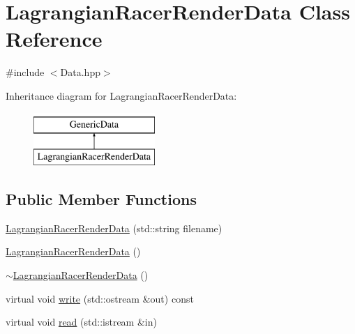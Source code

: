\hypertarget{class_lagrangian_racer_render_data}{\section{Lagrangian\-Racer\-Render\-Data Class Reference}
\label{class_lagrangian_racer_render_data}
}


{\ttfamily \#include $<$Data.\-hpp$>$}

Inheritance diagram for Lagrangian\-Racer\-Render\-Data\-:\begin{figure}[H]
\begin{center}
\leavevmode
\includegraphics[height=2.000000cm]{class_lagrangian_racer_render_data}
\end{center}
\end{figure}
\subsection*{Public Member Functions}
\begin{DoxyCompactItemize}
\item 
\hyperlink{class_lagrangian_racer_render_data_a727934cebfd0e7ef204f2a038be8ff23}{Lagrangian\-Racer\-Render\-Data} (std\-::string filename)
\item 
\hyperlink{class_lagrangian_racer_render_data_aae7fd9c0acf817800ce3875a81ef2ccb}{Lagrangian\-Racer\-Render\-Data} ()
\item 
\hyperlink{class_lagrangian_racer_render_data_a5c816ec06dc4e39b060eaad063e74d58}{$\sim$\-Lagrangian\-Racer\-Render\-Data} ()
\item 
virtual void \hyperlink{class_lagrangian_racer_render_data_a5df4617924f398cd1bf7c0fd633e8020}{write} (std\-::ostream \&out) const 
\item 
virtual void \hyperlink{class_lagrangian_racer_render_data_aa5174615686e62f00cf5d71ff870e5ca}{read} (std\-::istream \&in)
\end{DoxyCompactItemize}
